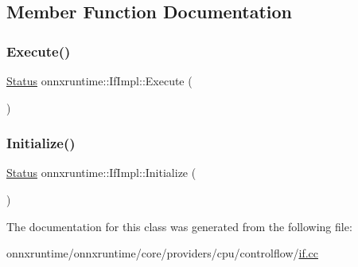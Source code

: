 \subsection{Member Function Documentation}
\mbox{\label{classonnxruntime_1_1IfImpl_a19b44e7ea93c10b171322f29adec8df3}} 
\subsubsection{\texorpdfstring{Execute()}{Execute()}}
{\footnotesize\ttfamily \mbox{\hyperlink{classonnxruntime_1_1common_1_1Status}{Status}} onnxruntime\+::\+If\+Impl\+::\+Execute (\begin{DoxyParamCaption}{ }\end{DoxyParamCaption})}

\mbox{\label{classonnxruntime_1_1IfImpl_a3a858a2f1e7fc3f31736e4ea28b6ff1b}} 
\subsubsection{\texorpdfstring{Initialize()}{Initialize()}}
{\footnotesize\ttfamily \mbox{\hyperlink{classonnxruntime_1_1common_1_1Status}{Status}} onnxruntime\+::\+If\+Impl\+::\+Initialize (\begin{DoxyParamCaption}{ }\end{DoxyParamCaption})}



The documentation for this class was generated from the following file\+:\begin{DoxyCompactItemize}
\item 
onnxruntime/onnxruntime/core/providers/cpu/controlflow/\mbox{\hyperlink{if_8cc}{if.\+cc}}\end{DoxyCompactItemize}
